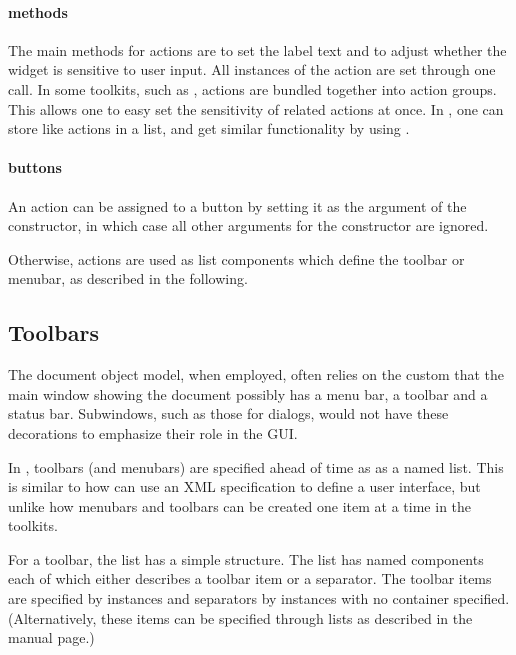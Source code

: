 \paragraph{methods}
The main methods for actions are  to
set the label text and  to adjust
whether the widget is sensitive to user input. All instances of the
action are set through one call. In some toolkits, such as
, actions are bundled together into action groups. This
allows one to easy set the sensitivity of related actions at once. In
\R, one can store like actions in a list, and get similar
functionality by using .

\paragraph{buttons}
An action can be assigned to a button by setting it as the
 argument of the  constructor, in which
case all other arguments for the constructor are ignored. 

Otherwise, actions are used as list components which define the
toolbar or menubar, as described in the following.



\subsection{Toolbars}
\label{sec:gWidgets-toolbars}

The document object model, when employed, often relies on the custom
that the main window showing the document possibly has a menu bar, a
toolbar and a status bar. Subwindows, such as those for dialogs, would
not have these decorations to emphasize their role in the GUI.


In , toolbars (and menubars) are specified ahead of time as as a named
list. This is similar to how  can use an XML specification
to define a user interface, but unlike how menubars and toolbars can
be created one item at a time in the toolkits.

For a toolbar, the list has a simple structure. The list has named
components each of which either describes a toolbar item or a
separator. The toolbar items are specified by  instances
and separators by  instances with no container
specified. (Alternatively, these items can be specified through lists as
described in the manual page.)


